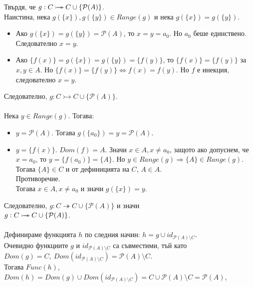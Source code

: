 \documentclass[french]{article}
\begin{document}
\begin{enumerate}
		Твърдя, че $g : C \mathbin{\rightarrowtail \hspace{-8pt} \twoheadrightarrow} C \cup \{{\mathcal{P}(A)}\}$. \\
		Наистина, нека $g(\{x\}), g(\{y\}) \in Range(g)$ и нека $g(\{x\}) = g(\{y\})$.
		\begin{itemize}
			\item Ако $g(\{x\}) = g(\{y\}) = \mathcal{P}(A)$, то $x = y = a_0$. Но $a_0$ беше единствено. Следователно $x = y$.
			\item Ако $\{f(x)\} = g(\{x\}) = g(\{y\}) =\{f(y)\}$, то $\{f(x)\} = \{f(y)\}$ за $x,y \in A$. Но $\{f(x)\} = \{f(y)\} \Longleftrightarrow f(x) = f(y)$. Но $f$ е инекция, следователно $x = y$.
		\end{itemize}
		Следователно, $g : C \rightarrowtail C \cup \{{\mathcal{P}(A)}\}$. \\
		\\
		Нека $y \in Range(g)$. Тогава:
		\begin{itemize}
			\item $y = \mathcal{P}(A)$. Тогава $g(\{a_0\}) = y = \mathcal{P}(A)$.
			\item $y = \{f(x)\}$. $Dom(f) = A$. Значи $x \in A, x \not= a_0$, защото ако допуснем, че $x = a_0$, то $y = \{f(a_0)\} = \{A\}$. Но $y \in Range(g) \Rightarrow \{A\} \in Range(g)$. Тогава $\{A\} \in C$ и от дефиницията на $C$, $A \in A$. \\
			Противоречие. \\
			Тогава $x \in A, x \not= a_0$ и значи $g(\{x\}) = y$.
		\end{itemize}
		Следователно, $g : C \twoheadrightarrow C \cup \{{\mathcal{P}(A)}\}$ и значи \\
		$g : C \mathbin{\rightarrowtail \hspace{-8pt} \twoheadrightarrow} C \cup \{{\mathcal{P}(A)}\}$. \\
		\\
		Дефинираме функцията $h$ по следния начин: $h = g \cup id_{\mathcal{P}(A) \setminus C}$. \\
		Очевидно функциите $g$ и $id_{\mathcal{P}(A) \setminus C}$ са съвместими, тъй като \\
		$Dom(g) = C,\ Dom(id_{\mathcal{P}(A) \setminus C}) = \mathcal{P}(A) \setminus C$. \\
		Тогава $Func(h)$, \\
		$Dom(h) = Dom(g) \cup Dom(id_{\mathcal{P}(A) \setminus C}) = C \cup \mathcal{P}(A) \setminus C = \mathcal{P}(A)$, \\

\end{enumerate}
\end{document}
